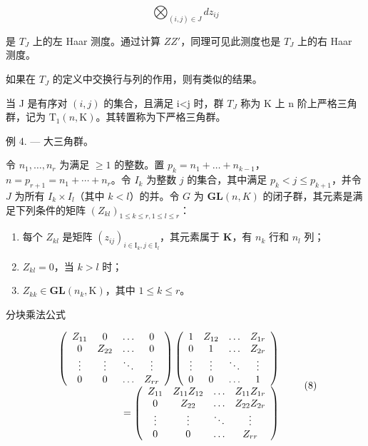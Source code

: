 \[
\bigotimes_ {(i, j) \in J} d z _ {i j}
\]

是 \(T_{J}\) 上的左 Haar 测度。通过计算 \(ZZ'\)，同理可见此测度也是 \(T_{J}\) 上的右 Haar 测度。

如果在 \(T_{J}\) 的定义中交换行与列的作用，则有类似的结果。

当 J 是有序对 \((i,j)\) 的集合，且满足 i\textless j 时，群 \(T_{J}\) 称为 K 上 n 阶上严格三角群，记为 \(\mathrm{T}_{1}(n,\mathrm{K})\)。其转置称为下严格三角群。

例 4. --- 大三角群。

令 \(n_1, \ldots, n_r\) 为满足 \(\geqslant 1\) 的整数。置 \(p_k = n_1 + \ldots + n_{k-1}\)，\(n = p_{r+1} = n_1 + \cdots + n_r\)。令 \(I_k\) 为整数 \(j\) 的集合，其中满足 \(p_k < j \leqslant p_{k+1}\)，并令 \(J\) 为所有 \(I_k \times I_l\)（其中 \(k < l\)）的并。令 \(G\) 为 \(\mathbf{GL}(n, K)\) 的闭子群，其元素是满足下列条件的矩阵 \((Z_{kl})_{1 \leqslant k \leqslant r, 1 \leqslant l \leqslant r}\)：

\begin{enumerate}
\def\labelenumi{\arabic{enumi})}
\item
  每个 \(Z_{kl}\) 是矩阵 \((z_{ij})_{i\in \mathrm{I}_k,j\in \mathrm{I}_l}\)，其元素属于 \(\mathbf{K}\)，有 \(n_k\) 行和 \(n_l\) 列；
\item
  \(Z_{kl} = 0\)，当 \(k > l\) 时；
\item
  \(Z_{kk} \in \mathbf{GL}(n_k, \mathrm{K})\)，其中 \(1 \leqslant k \leqslant r\)。
\end{enumerate}

分块乘法公式

\[
\begin{array}{r} \left( \begin{array}{c c c c} Z _ {1 1} & 0 & \ldots & 0 \\ 0 & Z _ {2 2} & \ldots & 0 \\ \vdots & \vdots & \ddots & \vdots \\ 0 & 0 & \ldots & Z _ {r r} \end{array} \right) \left( \begin{array}{c c c c} 1 & Z _ {1 2} & \ldots & Z _ {1 r} \\ 0 & 1 & \ldots & Z _ {2 r} \\ \vdots & \vdots & \ddots & \vdots \\ 0 & 0 & \ldots & 1 \end{array} \right) \\ = \left( \begin{array}{c c c c} Z _ {1 1} & Z _ {1 1} Z _ {1 2} & \ldots & Z _ {1 1} Z _ {1 r} \\ 0 & Z _ {2 2} & \ldots & Z _ {2 2} Z _ {2 r} \\ \vdots & \vdots & \ddots & \vdots \\ 0 & 0 & \ldots & Z _ {r r} \end{array} \right) \end{array}\tag{8}
\]

